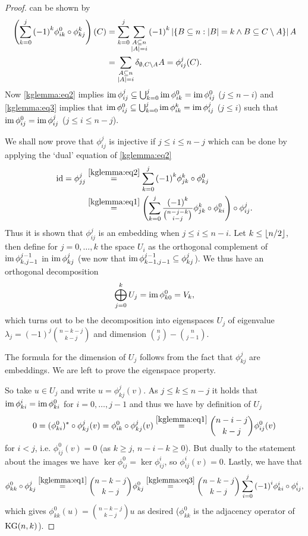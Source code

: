 \begin{proof}
  can be shown by
  \begin{align*}
      \left(\sum_{k=0}^{j}{{(-1)}^k\phi^0_{ik}\circ\phi^k_{kj}}\right)(C)
      & = \sum_{k=0}^{j}\sum_{\substack{A\subseteq n\\ \left|A\right|=i}}{{(-1)}^k\left|\{B\subseteq
              n:\left|B\right|=k\wedge  B\subseteq C\setminus A\}\right|A}\\
      & = \sum_{\substack{A\subseteq n\\ \left|A\right|=i}}{\delta_{\emptyset,C\setminus A}A} = \phi^j_{ij}(C)\text{.}
  \end{align*}
  Now \autoref{kglemma:eq2}
  implies $\mathop\mathrm{im}\phi_{ij}^j\subseteq\bigcup_{k=0}^j{\mathop\mathrm{im}\phi_{ik}^0}=\mathop\mathrm{im}\phi_{ij}^0$ ($j\leq n-i$) and \autoref{kglemma:eq3}%
  implies that $\mathop\mathrm{im}\phi_{ij}^0\subseteq\bigcup_{k=0}^j{\mathop\mathrm{im}\phi_{ik}^k}=\mathop\mathrm{im}\phi_{ij}^j$ ($j\leq i$) such that $\mathop\mathrm{im}\phi_{ij}^0=\mathop\mathrm{im}\phi_{ij}^j$ ($j\leq i\leq n-j$).
  
  We shall now prove that $\phi^j_{ij}$ is injective if $j\leq i\leq n-j$ which can be done by applying the `dual' equation of \autoref{kglemma:eq2}
  \begin{align*}
      \id=\phi^j_{jj}
      & \stackrel{\autoref{kglemma:eq2}}{=}
      \sum_{k=0}^{j}{{(-1)}^k\phi^k_{jk}\compose\phi^0_{kj}}\\
      & \stackrel{\autoref{kglemma:eq1}}{=} \left(\sum_{k=0}^{j}{\frac{{(-1)}^k}{\binom{n-j-k}{i-j}}\phi^k_{jk}\compose\phi^0_{ki}}\right)\compose\phi^j_{ij}\text{.}
  \end{align*}
  Thus it is shown that $\phi^j_{ij}$ is an embedding when $j\leq i\leq n-i$. Let $k\leq \left\lfloor n/2\right\rfloor$, then define for $j=0,\ldots,k$ the space $U_i$ as the orthogonal complement of $\mathop\mathrm{im}\phi_{k,j-1}^{j-1}$ in $\mathop\mathrm{im}\phi_{kj}^j$ (we now that $\mathop\mathrm{im}\phi_{k-1,j-1}^{j-1}\subseteq\phi_{kj}^j$). We thus have an orthogonal decomposition
  $$
  \bigoplus_{j=0}^k{U_j}=\mathop\mathrm{im}\phi_{k0}^0=V_k,
  $$
  which turns out to be the decomposition into eigenspaces $U_j$ of eigenvalue $\lambda_j={(-1)}^j\binom{n-k-j}{k-j}$ and dimension $\binom{n}{j}-\binom{n}{j-1}$.

  The formula for the dimension of $U_j$ follows from the fact that $\phi_{kj}^j$ are embeddings. We are left to prove the eigenspace property.

  So take $u\in U_j$ and write $u=\phi_{kj}^j(v)$. As $j\leq k\leq n-j$ it holds that $\mathop\mathrm{im}\phi_{ki}^i=\mathop\mathrm{im}\phi_{ki}^0$ for $i=0,\ldots,j-1$ and thus we have by definition of $U_j$
  $$
  0=\dual{(\phi_{ki}^0)}\compose\phi_{kj}^j(v)=\phi_{ik}^0\compose\phi_{kj}^j(v)\stackrel{\autoref{kglemma:eq1}}{=}\binom{n-i-j}{k-j}\phi_{ij}^0(v)
  $$
  for $i<j$, i.e. $\phi_{ij}^0(v)=0$ (as $k\geq j$, $n-i-k\geq 0$). But dually to the statement about the images we have $\ker\phi_{ij}^0=\ker\phi_{ij}^i$, so $\phi_{ij}^i(v)=0$.
  Lastly, we have that
  $$
  \phi_{kk}^0\compose\phi_{kj}^j\stackrel{\autoref{kglemma:eq1}}{=}\binom{n-k-j}{k-j}\phi_{kj}^0\stackrel{\autoref{kglemma:eq3}}{=}\binom{n-k-j}{k-j}\sum_{i=0}^j{{(-1)}^i\phi_{ki}^i\compose\phi_{ij}^i},
  $$
  which gives $\phi_{kk}^0(u)=\binom{n-k-j}{k-j}u$ as desired ($\phi_{kk}^0$ is the adjacency operator of $\mathop\mathrm{KG}(n,k)$).
\end{proof}

